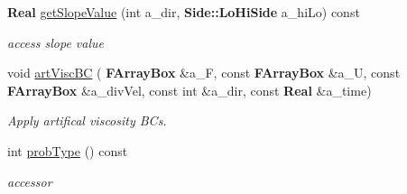 \begin{DoxyCompactItemize}
\textbf{ Real} \hyperlink{class_advect_i_b_c_a9a468f14c7b56b839c212067ca031ca3}{get\+Slope\+Value} (int a\+\_\+dir, \textbf{ Side\+::\+Lo\+Hi\+Side} a\+\_\+hi\+Lo) const
\begin{DoxyCompactList}\small\item\em access slope value \end{DoxyCompactList}\item 
\mbox{\label{class_advect_i_b_c_a8109239cfc7cc3637da64045e4df1f30}} 
void \hyperlink{class_advect_i_b_c_a8109239cfc7cc3637da64045e4df1f30}{art\+Visc\+BC} (\textbf{ F\+Array\+Box} \&a\+\_\+F, const \textbf{ F\+Array\+Box} \&a\+\_\+U, const \textbf{ F\+Array\+Box} \&a\+\_\+div\+Vel, const int \&a\+\_\+dir, const \textbf{ Real} \&a\+\_\+time)
\begin{DoxyCompactList}\small\item\em Apply artifical viscosity B\+Cs. \end{DoxyCompactList}\item 
\mbox{\label{class_advect_i_b_c_aee5291ebf8c7c39ca80bfe863d186415}} 
int \hyperlink{class_advect_i_b_c_aee5291ebf8c7c39ca80bfe863d186415}{prob\+Type} () const
\begin{DoxyCompactList}\small\item\em accessor \end{DoxyCompactList}\end{DoxyCompactItemize}
